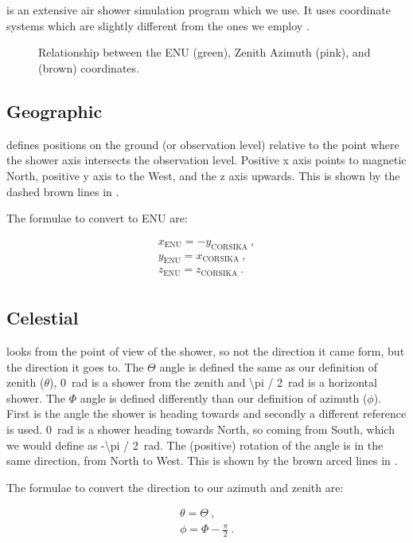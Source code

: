 \section{\corsika}

\corsika is an extensive air shower simulation program which we use. It
uses coordinate systems which are slightly different from the ones we
employ \cite{heck:2013aa}.

\begin{figure}
    \centering
    
    \caption{Relationship between the ENU (green), Zenith Azimuth (pink),
             and \corsika (brown) coordinates.}
    \label{fig:enu_corsika}
\end{figure}


\subsection{Geographic}

\corsika defines positions on the ground (or observation level) relative
to the point where the shower axis intersects the observation level.
Positive x axis points to magnetic North, positive y axis to the West,
and the z axis upwards. This is shown by the dashed brown lines in
.

The formulae to convert \corsika to ENU are:

\begin{equation}
    \begin{array}{l}
        x_{\mathrm{ENU}} = -y_{\mathrm{CORSIKA}} \ , \\
        y_{\mathrm{ENU}} = x_{\mathrm{CORSIKA}} \ , \\
        z_{\mathrm{ENU}} = z_{\mathrm{CORSIKA}} \ . \\
    \end{array}
\end{equation}


\subsection{Celestial}

\corsika looks from the point of view of the shower, so not the
direction it came form, but the direction it goes to. The $\Theta$ angle
is defined the same as our definition of zenith ($\theta$),
\SI{0}{\radian} is a shower from the zenith and \SI{\pi / 2}{\radian} is
a horizontal shower. The $\Phi$ angle is defined differently than our
definition of azimuth ($\phi$). First is the angle the shower is heading
towards and secondly a different reference is used. \SI{0}{\radian} is a
shower heading towards North, so coming from South, which we would
define as \SI{-\pi / 2}{\radian}. The (positive) rotation of the angle
is in the same direction, from North to West. This is shown by the brown
arced lines in .

The formulae to convert the \corsika direction to our azimuth and zenith
are:

\begin{equation}
    \begin{array}{l}
        \theta = \Theta \ , \\
        \phi = \Phi - \frac{\pi}{2} \ . \\
    \end{array}
\end{equation}
